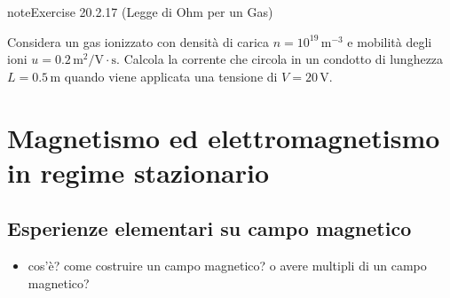 \documentclass[letterpaper,10pt,italian]{jupyterBook}
\begin{document}
\begin{sphinxadmonition}{note}{Exercise 20.2.17 (Legge di Ohm per un Gas)}



\sphinxAtStartPar
Considera un gas ionizzato con densità di carica \(n = 10^{19} \, \text{m}^{-3}\) e mobilità degli ioni \(u = 0.2 \, \text{m}^2/\text{V} \cdot \text{s}\). Calcola la corrente che circola in un condotto di lunghezza \(L = 0.5 \, \text{m}\) quando viene applicata una tensione di \(V = 20 \, \text{V}\).
\end{sphinxadmonition}

\sphinxstepscope


\section{Magnetismo ed elettromagnetismo in regime stazionario}
\label{\detokenize{ch/electromagnetism/electromagnetism-steady:magnetismo-ed-elettromagnetismo-in-regime-stazionario}}\label{\detokenize{ch/electromagnetism/electromagnetism-steady:physics-hs-electromagnetism-electromagnetism-steady}}\label{\detokenize{ch/electromagnetism/electromagnetism-steady::doc}}

\subsection{Esperienze elementari su campo magnetico}
\label{\detokenize{ch/electromagnetism/electromagnetism-steady:esperienze-elementari-su-campo-magnetico}}\label{\detokenize{ch/electromagnetism/electromagnetism-steady:physics-hs-electromagnetism-electromagnetism-steady-experience}}\begin{itemize}
\item {} 
\sphinxAtStartPar
cos’è? come costruire un campo magnetico? o avere multipli di un campo magnetico?

\end{itemize}
\end{document}
